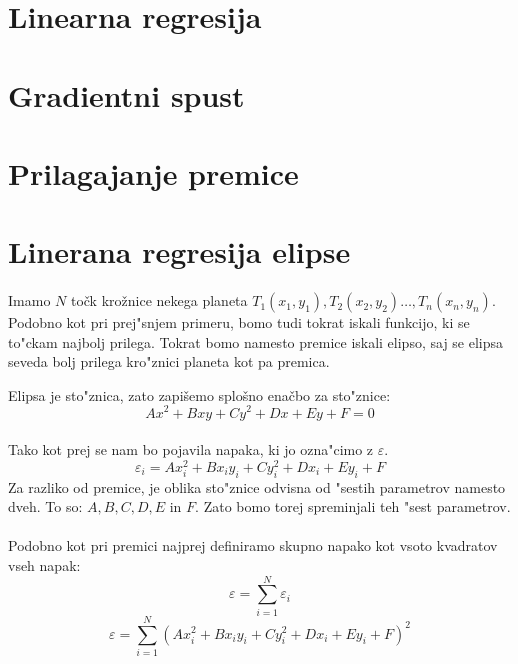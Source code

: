 \documentclass[a4paper, 12pt]{article}
\begin{document}
	\section*{Linearna regresija}
	

	\section*{Gradientni spust}
	
	
	\section*{Prilagajanje premice}
	

	\section*{Linerana regresija elipse}
	\paragraph{}
	Imamo $N$ točk krožnice nekega planeta $T_1(x_1, y_1), T_2(x_2, y_2) \ldots, T_n(x_n, y_n)$. Podobno kot pri prej"snjem primeru, bomo tudi tokrat iskali funkcijo, ki se to"ckam najbolj prilega. Tokrat bomo namesto premice iskali elipso, saj se elipsa seveda bolj prilega kro"znici planeta kot pa premica.


	Elipsa je sto"znica, zato zapišemo splošno enačbo za sto"znice:
	$$Ax^2 + Bxy + Cy^2 + Dx + Ey + F = 0$$

	\paragraph{}
	Tako kot prej se nam bo pojavila napaka, ki jo ozna"cimo z $\varepsilon$.
	$$\varepsilon_i = Ax_i^2 + Bx_iy_i + Cy_i^2 + Dx_i + Ey_i + F$$
	Za razliko od premice, je oblika sto"znice odvisna od "sestih parametrov namesto dveh. To so: $A, B, C, D, E$ in $F$. Zato bomo torej spreminjali teh "sest parametrov.

	\paragraph{}
	Podobno kot pri premici najprej definiramo skupno napako kot vsoto kvadratov vseh napak:
	\[\varepsilon = \sum_{i=1}^{N}\varepsilon_i\]
	\[\varepsilon = \sum_{i=1}^{N} (Ax_i^2 + Bx_iy_i + Cy_i^2 + Dx_i + Ey_i + F)^2\]
\end{document}
